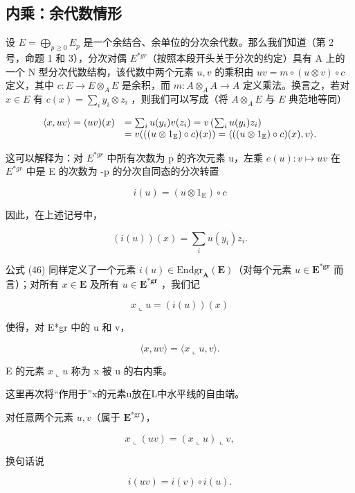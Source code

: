 \subsection{内乘：余代数情形}

设 \(E = \bigoplus_{p \geq 0} E_p\) 是一个余结合、余单位的分次余代数。那么我们知道（第 2 号，命题 1 和 3），分次对偶 \(E^{*gr}\)（按照本段开头关于分次的约定）具有 A 上的一个 N 型分次代数结构，该代数中两个元素 \(u, v\) 的乘积由 \(uv = m \circ (u \otimes v) \circ c\) 定义，其中 \(c: E \to E \otimes_A E\) 是余积，而 \(m: A \otimes_A A \to A\) 定义乘法。换言之，若对 \(x \in E\) 有 \(c(x) = \sum_i y_i \otimes z_i\) ，则我们可以写成（将 \(A \otimes_A E\) 与 \(E\) 典范地等同）

\[
\begin{array}{r l} \langle x, u v \rangle = (u v) (x) & = \sum_ {i} u (y _ {i}) v (z _ {i}) = v \left(\sum_ {i} u (y _ {i}) z _ {i}\right) \\ & = v (((u \otimes 1 _ {\mathbb {E}}) \circ c) (x)) = \langle ((u \otimes 1 _ {\mathbb {E}}) \circ c) (x), v \rangle . \end{array}
\]

这可以解释为：对 \(E^{*gr}\) 中所有次数为 p 的齐次元素 u，左乘 \(e(u): v \mapsto uv\) 在 \(E^{*gr}\) 中是 E 的次数为 -p 的分次自同态的分次转置

\[
i (u) = (u \otimes 1 _ {\mathrm{E}}) \circ c\tag{46}
\]

因此，在上述记号中，

\[
(i (u)) (x) = \sum_ {i} u (y _ {i}) z _ {i}.
\]

公式 (46) 同样定义了一个元素 \(i(u)\in\mathrm{Endgr}_{\mathbf{A}}(\mathbf{E})\)（对每个元素 \(u\in\mathbf{E}^{*\mathbf{g}\mathbf{r}}\) 而言）；对所有 \(x\in\mathbf{E}\) 及所有 \(u\in\mathbf{E}^{*\mathbf{g}\mathbf{r}}\) ，我们记

\[
x \llcorner u = (i (u)) (x)\tag{47}
\]

使得，对 E*gr 中的 u 和 v，

\[
\langle x, u v \rangle = \langle x \llcorner u, v \rangle .
\]

E 的元素 \(x \llcorner u\) 称为 x 被 u 的右内乘。

这里再次将“作用于”x的元素u放在L中水平线的自由端。

对任意两个元素 \(u, v\)（属于 \(\mathbf{E}^{*\mathrm{gr}}\)），

\[
x \llcorner (u v) = (x \llcorner u) \llcorner v,\tag{48}
\]

换句话说

\[
i (u v) = i (v) \circ i (u).
\]

